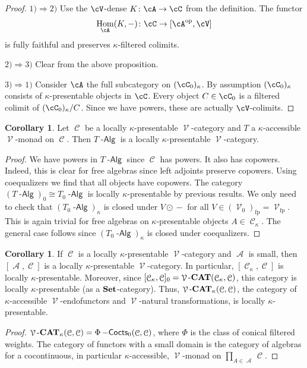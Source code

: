 \documentclass[a4paper,11pt,oneside,openany]{scrbook}
\newcommand{\catname}[1]{{\normalfont\textbf{#1}}}
\DeclareMathOperator{\Alg}{-\mathsf{Alg}}
\newcommand{\Set}{\catname{Set}}
\newcommand{\CAT}{\catname{CAT}}
\newcommand{\from}{\colon}
\DeclareMathOperator{\Hom}{\text{Hom}}
\DeclareMathOperator{\op}{\text{op}}
\DeclareMathOperator{\V}{\mathcal{V}}
\DeclareMathOperator{\A}{\mathcal{A}}
\DeclareMathOperator{\C}{\mathcal{C}}
\DeclareMathOperator{\Cocts}{-\mathsf{Cocts}}
\DeclareMathOperator{\copw}{\odot}
\theoremstyle{definition}
\theoremstyle{definition}
\newtheorem{cor}[thm]{Corollary}
\begin{document}
\begin{proof}
\item[$ 1)\Rightarrow 2) $]
    Use the $ \cV $-dense $ K \from \cA \to \cC $ from the definition.
    The functor
    \begin{displaymath}
	\Hom_{\cA}(K,-)\from \cC \to [\cA^{\op},\cV]
    \end{displaymath}
    is fully faithful and preserves $ \kappa $-filtered colimits.
\item[$ 2) \Rightarrow 3) $]
    Clear from the above proposition.
\item[$ 3) \Rightarrow 1) $]
    Consider $ \cA $ the full subcategory on $ (\cC_0)_\kappa $.
    By assumption $ (\cC_0)_\kappa $ consists of $ \kappa $-presentable objects in $ \cC $.
    Every object $ C \in\cC_0 $ is a filtered colimit of $ (\cC_0)_\kappa / C $.
    Since we have powers, these are actually $ \cV $-colimits.
\end{proof}
\begin{cor}
    Let $\C$ be a locally $\kappa$-presentable $\V$-category and $T$ a $\kappa$-accessible $\V$-monad on $\C$. Then $T\Alg$ is a locally $\kappa$-presentable $\V$-category.
\end{cor}
\begin{proof}
We have powers in $T\Alg$ since $\C$ has powers. It also has copowers. Indeed, this is clear for free algebras since left adjoints preserve copowers. Using coequalizers we find that all objects have copowers. The category $(T\Alg)_0\cong T_0\Alg$ is locally $\kappa$-presentable by previous results. We only need to check that $(T_0\Alg)_{\kappa}$ is closed under $V\copw-$ for all $V\in(\V_0)_{\text{fp}}=\V_{\text{fp}}$. This is again trivial for free algebras on $\kappa$-presentable objects $A\in\C_\kappa$. The general case follows since $(T_0\Alg)_\kappa$ is closed under coequalizers. 
\end{proof}
\begin{cor}
If $\C$ is a locally $\kappa$-presentable $\V$-category and $\A$ is small, then $[\A,\C]$ is a locally $\kappa$-presentable $\V$-category. In particular, $[\C_\kappa, \C]$ is locally $\kappa$-presentable. Moreover, since  $[\C_\kappa, \C]_0 = \V\mbox{-}\CAT(\C_\kappa,\C)$, this category is locally $\kappa$-presentable (as a $\Set$-category). Thus, $\V\mbox{-}\CAT_\kappa(\C,\C)$, the category of $\kappa$-accessible $\V$-endofunctors and $\V$-natural transformations, is locally $\kappa$-presentable.
\end{cor}
\begin{proof}
$\V\mbox{-}\CAT_\kappa(\C,\C)=\Phi\Cocts_0(\C,\C)$, where $\Phi$ is the class of conical filtered weights. The category of functors with a small domain is the category of algebras for a cocontinuous, in particular $\kappa$-accessible, $\V$-monad on $\prod_{A\in\A}\C$.
\end{proof}
\end{document}
